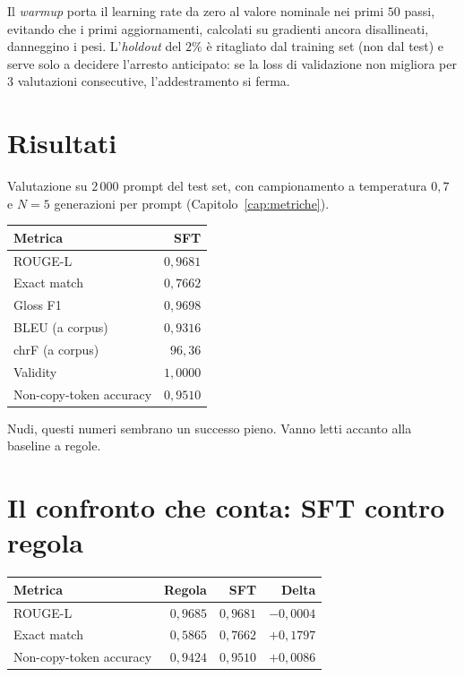 Il \emph{warmup} porta il learning rate da zero al valore nominale nei primi
$50$ passi, evitando che i primi aggiornamenti, calcolati su gradienti ancora
disallineati, danneggino i pesi. L'\emph{holdout} del $2\%$ è ritagliato dal
training set (non dal test) e serve solo a decidere l'arresto anticipato: se la
loss di validazione non migliora per $3$ valutazioni consecutive,
l'addestramento si ferma.

\section{Risultati}

Valutazione su $2\,000$ prompt del test set, con campionamento a temperatura
$0{,}7$ e $N=5$ generazioni per prompt (Capitolo~\ref{cap:metriche}).

\begin{center}
\begin{tabular}{lr}
\toprule
Metrica & SFT \\
\midrule
ROUGE-L & $0{,}9681$ \\
Exact match & $0{,}7662$ \\
Gloss F1 & $0{,}9698$ \\
BLEU (a corpus) & $0{,}9316$ \\
chrF (a corpus) & $96{,}36$ \\
Validity & $1{,}0000$ \\
Non-copy-token accuracy & $0{,}9510$ \\
\bottomrule
\end{tabular}
\end{center}

Nudi, questi numeri sembrano un successo pieno. Vanno letti accanto alla
baseline a regole.

\section{Il confronto che conta: SFT contro regola}

\begin{center}
\begin{tabular}{lrrr}
\toprule
Metrica & Regola & SFT & Delta \\
\midrule
ROUGE-L & $0{,}9685$ & $0{,}9681$ & $-0{,}0004$ \\
Exact match & $0{,}5865$ & $0{,}7662$ & $+0{,}1797$ \\
Non-copy-token accuracy & $0{,}9424$ & $0{,}9510$ & $+0{,}0086$ \\
\bottomrule
\end{tabular}
\end{center}

